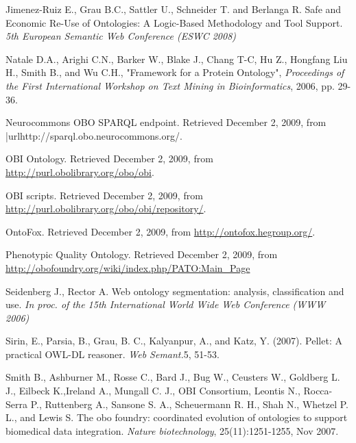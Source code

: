 \documentclass[jou]{ao2e}%
\begin{document}
\begin{thebibliography}{}
 Jimenez-Ruiz E., Grau B.C., Sattler U., Schneider T. and Berlanga R. Safe and Economic Re-Use of Ontologies: A Logic-Based Methodology and Tool Support. \textit{5th European Semantic Web Conference (ESWC 2008)} 

 Natale D.A., Arighi C.N., Barker W., Blake J., Chang T-C, Hu Z., Hongfang Liu H., Smith B., and Wu C.H., "Framework for a Protein Ontology", \textit{Proceedings of the First International Workshop on Text Mining in Bioinformatics}, 2006, pp. 29-36.

 Neurocommons OBO SPARQL endpoint. Retrieved December 2, 2009, from |url{http://sparql.obo.neurocommons.org/}.

 OBI Ontology. Retrieved December 2, 2009, from \url{http://purl.obolibrary.org/obo/obi}.

 OBI scripts. Retrieved December 2, 2009, from \url{http://purl.obolibrary.org/obo/obi/repository/}.

 OntoFox. Retrieved December 2, 2009, from \url{http://ontofox.hegroup.org/}.

 Phenotypic Quality Ontology. Retrieved December 2, 2009, from \url{http://obofoundry.org/wiki/index.php/PATO:Main_Page}

 Seidenberg J., Rector A. Web ontology segmentation: analysis, classification and use. \textit{In proc. of the 15th International World Wide Web Conference (WWW 2006)}

 Sirin, E., Parsia, B., Grau, B. C., Kalyanpur, A., and Katz, Y. (2007). Pellet: A practical OWL-DL reasoner. \textit{Web Semant.}5, 51-53. 
 
  Smith B., Ashburner M., Rosse C., Bard J., Bug W., Ceusters W., Goldberg L. J., Eilbeck K.,Ireland A., Mungall C. J., OBI Consortium, Leontis N., Rocca-Serra P., Ruttenberg A., Sansone S. A., Scheuermann R. H., Shah N., Whetzel P. L., and Lewis S. The obo foundry: coordinated evolution of ontologies to support biomedical data integration. \textit{Nature biotechnology}, 25(11):1251-1255, Nov 2007. 
 

\end{thebibliography}
\end{document}
